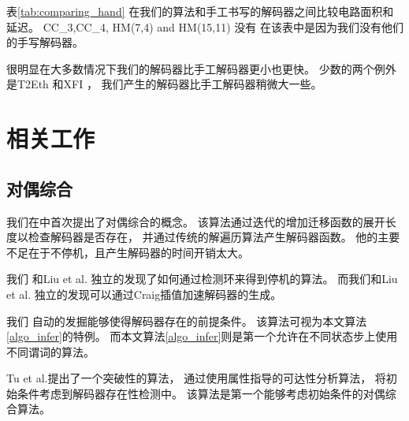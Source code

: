 表\ref{tab:comparing_hand} 在我们的算法和手工书写的解码器之间比较电路面积和延迟。
CC\_3,CC\_4, HM(7,4) and HM(15,11) 没有
在该表中是因为我们没有他们的手写解码器。

很明显在大多数情况下我们的解码器比手工解码器更小也更快。
少数的两个例外是T2Eth 和XFI ，
我们产生的解码器比手工解码器稍微大一些。

\section{相关工作}\label{sec_relwork}
%
%

\subsection{对偶综合}\label{subsec_compsyn_relat}
我们在中首次提出了对偶综合的概念。
该算法通过迭代的增加迁移函数的展开长度以检查解码器是否存在，
并通过传统的解遍历算法产生解码器函数。
他的主要不足在于不停机，且产生解码器的时间开销太大。

我们 和Liu et al. 独立的发现了如何通过检测环来得到停机的算法。
而我们和Liu et al. 独立的发现可以通过Craig插值加速解码器的生成。

我们 自动的发掘能够使得解码器存在的前提条件。
该算法可视为本文算法\ref{algo_infer}的特例。
而本文算法\ref{algo_infer}则是第一个允许在不同状态步上使用不同谓词的算法。

Tu et al.提出了一个突破性的算法，
通过使用属性指导的可达性分析算法，
将初始条件考虑到解码器存在性检测中。
该算法是第一个能够考虑初始条件的对偶综合算法。

